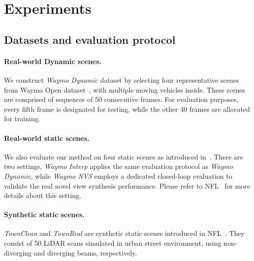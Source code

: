 \section{Experiments}

\subsection{Datasets and evaluation protocol}\label{sec:datasets}

\paragraph{Real-world Dynamic scenes.} 
We construct \textit{Waymo Dynamic} dataset by selecting four representative scenes from Waymo Open dataset~\cite{sun2020scalability}, with multiple moving vehicles inside. These scenes are comprised of sequences of 50 consecutive frames. For evaluation purposes, every fifth frame is designated for testing, while the other 40 frames are allocated for training.


\paragraph{Real-world static scenes.}
We also evaluate our method on four static scenes as introduced in~\cite{Huang2023nfl}. There are two settings, \textit{Waymo Interp} applies the same evaluation protocol as \textit{Waymo Dynamic}, while \textit{Waymo NVS} employs a dedicated closed-loop evaluation to validate the real novel view synthesis performance. Please refer to NFL~\cite{Huang2023nfl} for more details about this setting. 
 



\paragraph{Synthetic static scenes.}  
\textit{TownClean} and \textit{TownReal} are synthetic static scenes introduced in NFL~\cite{Huang2023nfl}. They consist of 50 LiDAR scans simulated in urban street environment, using non-diverging and diverging beams, respectively. 

